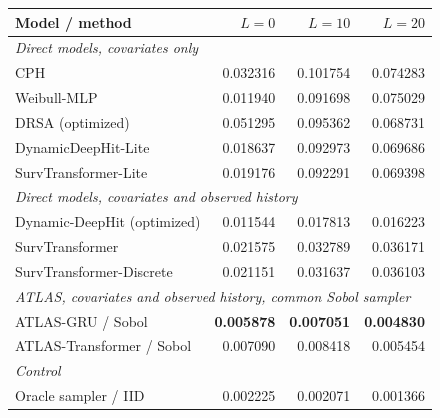 \begin{center}\begin{minipage}{\textwidth}\centering\small
\begin{tabular}{lrrr}
\toprule
Model / method & $L=0$ & $L=10$ & $L=20$ \\\midrule
\multicolumn{4}{l}{\textit{Direct models, covariates only}}\\
CPH & 0.032316 & 0.101754 & 0.074283 \\
Weibull-MLP & 0.011940 & 0.091698 & 0.075029 \\
DRSA (optimized) & 0.051295 & 0.095362 & 0.068731 \\
DynamicDeepHit-Lite & 0.018637 & 0.092973 & 0.069686 \\
SurvTransformer-Lite & 0.019176 & 0.092291 & 0.069398 \\
\multicolumn{4}{l}{\textit{Direct models, covariates and observed history}}\\
Dynamic-DeepHit (optimized) & 0.011544 & 0.017813 & 0.016223 \\
SurvTransformer & 0.021575 & 0.032789 & 0.036171 \\
SurvTransformer-Discrete & 0.021151 & 0.031637 & 0.036103 \\
\multicolumn{4}{l}{\textit{ATLAS, covariates and observed history, common Sobol sampler}}\\
ATLAS-GRU / Sobol & \textbf{0.005878} & \textbf{0.007051} & \textbf{0.004830} \\
ATLAS-Transformer / Sobol & 0.007090 & 0.008418 & 0.005454 \\
\multicolumn{4}{l}{\textit{Control}}\\
Oracle sampler / IID & 0.002225 & 0.002071 & 0.001366 \\
\bottomrule\end{tabular}
\label{tab:cr_cause_a}
\end{minipage}\end{center}